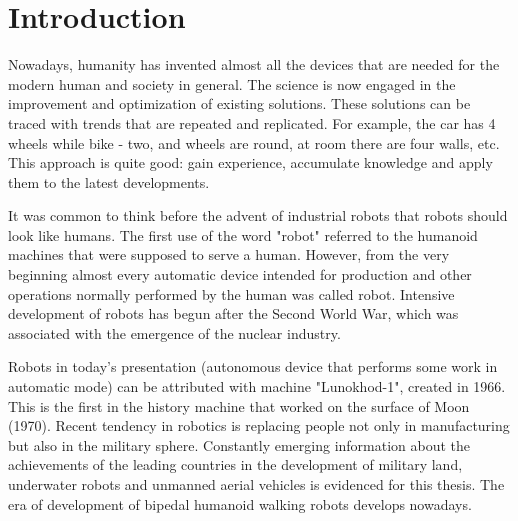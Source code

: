 \documentclass[11pt,a4paper]{article}
\begin{document}
\newpage

\section{Introduction}
Nowadays, humanity has invented almost all the devices that are needed for the modern human and society in general. The science is now engaged in the improvement and optimization of existing solutions. These solutions can be traced with trends that are repeated and replicated. For example, the car has 4 wheels while bike - two, and wheels are round, at room there are four walls, etc. This approach is quite good: gain experience, accumulate knowledge and apply them to the latest developments.

It was common to think before the advent of industrial robots that robots should look like humans. The first use of the word "robot" referred to the humanoid machines that were supposed to serve a human. However, from the very beginning almost every automatic device intended for production and other operations normally performed by the human was called robot. Intensive development of robots has begun after the Second World War, which was associated with the emergence of the nuclear industry.

Robots in today's presentation (autonomous device that performs some work in automatic mode) can be attributed with machine "Lunokhod-1", created in 1966. This is the first in the history machine that worked on the surface of Moon (1970). Recent tendency in robotics is replacing people not only in manufacturing but also in the military sphere. Constantly emerging information about the achievements of the leading countries in the development of military land, underwater robots and unmanned aerial vehicles is evidenced for this thesis. The era of development of  bipedal humanoid walking robots develops nowadays.
\end{document}

